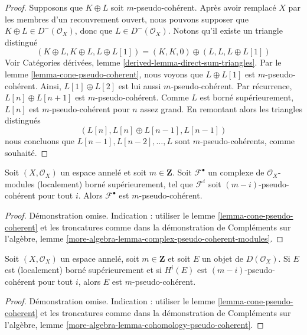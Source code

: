 \begin{proof}

Supposons que $K \oplus L$ soit $m$-pseudo-cohérent. Après avoir remplacé $X$ par les membres d'un recouvrement ouvert, nous pouvons supposer que $K \oplus L \in D^-(\mathcal{O}_X)$, donc que
$L \in D^-(\mathcal{O}_X)$. Notons qu'il existe un triangle distingué
$$
(K \oplus L, K \oplus L, L \oplus L[1]) =
(K, K, 0) \oplus (L, L, L \oplus L[1])
$$
Voir Catégories dérivées, lemme \ref{derived-lemma-direct-sum-triangles}. Par le lemme \ref{lemma-cone-pseudo-coherent},
nous voyons que $L \oplus L[1]$ est $m$-pseudo-cohérent. Ainsi, $L[1] \oplus L[2]$ est lui aussi $m$-pseudo-cohérent. Par récurrence, $L[n] \oplus L[n + 1]$ est $m$-pseudo-cohérent. Comme $L$ est borné supérieurement, $L[n]$ est $m$-pseudo-cohérent pour $n$ assez grand. En remontant alors les triangles distingués
$$
(L[n], L[n] \oplus L[n - 1], L[n - 1])
$$
nous concluons que $L[n - 1], L[n - 2], \ldots, L$ sont $m$-pseudo-cohérents, comme souhaité.

\end{proof}

\begin{lemma}

\label{lemma-complex-pseudo-coherent-modules}
Soit $(X, \mathcal{O}_X)$ un espace annelé et soit $m \in \mathbf{Z}$. Soit $\mathcal{F}^\bullet$ un complexe de $\mathcal{O}_X$-modules (localement) borné supérieurement, tel que $\mathcal{F}^i$ soit $(m - i)$-pseudo-cohérent pour tout $i$. Alors $\mathcal{F}^\bullet$ est $m$-pseudo-cohérent.
\end{lemma}

\begin{proof}
Démonstration omise. Indication : utiliser le lemme \ref{lemma-cone-pseudo-coherent} et les troncatures comme dans la démonstration de Compléments sur l'algèbre, lemme \ref{more-algebra-lemma-complex-pseudo-coherent-modules}.
\end{proof}

\begin{lemma}

\label{lemma-cohomology-pseudo-coherent}
Soit $(X, \mathcal{O}_X)$ un espace annelé, soit $m \in \mathbf{Z}$ et soit $E$ un objet de $D(\mathcal{O}_X)$. Si $E$ est (localement) borné supérieurement et si $H^i(E)$ est $(m - i)$-pseudo-cohérent pour tout $i$, alors $E$ est $m$-pseudo-cohérent.
\end{lemma}

\begin{proof}
Démonstration omise. Indication : utiliser le lemme \ref{lemma-cone-pseudo-coherent} et les troncatures comme dans la démonstration de Compléments sur l'algèbre, lemme \ref{more-algebra-lemma-cohomology-pseudo-coherent}.
\end{proof}


